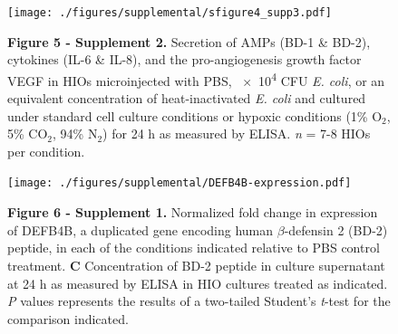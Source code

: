 \documentclass[9pt,lineo]{elife}
\begin{document}
\begin{figure}
\begin{fullwidth}
\centering\texttt{[image: ./figures/supplemental/sfigure4\_supp3.pdf]}
\caption*{\textbf{Figure 5 - Supplement 2. } Secretion of AMPs (BD-1 \& BD-2), cytokines (IL-6 \& IL-8), and the pro-angiogenesis growth factor VEGF in HIOs microinjected with PBS, \num{e4} CFU \textit{E. coli}, or an equivalent concentration of heat-inactivated \textit{E. coli} and cultured under standard cell culture conditions or hypoxic conditions (1\% O$_{2}$, 5\% CO$_{2}$, 94\% N$_{2}$) for 24 h as measured by ELISA. \textit{n} = 7-8 HIOs per condition.}
\label{fig:fullwidth}
\end{fullwidth}
\end{figure}
\begin{figure}
\begin{fullwidth}
\centering\texttt{[image: ./figures/supplemental/DEFB4B-expression.pdf]}
\caption*{\textbf{Figure 6 - Supplement 1. }Normalized fold change in expression of DEFB4B, a duplicated gene encoding human $\beta$-defensin 2 (BD-2) peptide, in each of the conditions indicated relative to PBS control treatment. \textbf{C} Concentration of BD-2 peptide in culture supernatant at 24 h as measured by ELISA in HIO cultures treated as indicated. \textit{P} values represents the results of a two-tailed Student's \textit{t}-test for the comparison indicated.}
\label{fig:fullwidth}
\end{fullwidth}
\end{figure}
\end{document}
